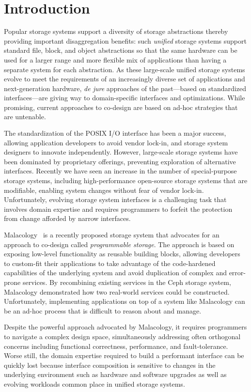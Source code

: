 \section{Introduction}
\label{sec:intro}

Popular storage systems support a diversity of storage abstractions thereby
providing important disaggregation benefits: such \emph{unified} storage
systems support standard file, block, and object abstractions so that the same
hardware can be used for a larger range and more flexible mix of applications
than having a separate  system for each abstraction.  As these large-scale
unified storage systems evolve to meet the requirements of an increasingly
diverse set of applications and next-generation hardware, \emph{de jure}
approaches of the past---based on standardized interfaces---are giving way to
domain-specific interfaces and optimizations. While promising, current
approaches to co-design are based on ad-hoc strategies that are untenable.

The standardization of the POSIX I/O interface has been a major success,
allowing application developers to avoid vendor lock-in, and storage system
designers to innovate independently.
However, large-scale storage systems have been
dominated by proprietary offerings, preventing exploration of alternative
interfaces. Recently we have seen an increase
in the number of special-purpose storage systems, including high-performance
open-source storage systems that are modifiable, enabling system changes
without fear of vendor lock-in. Unfortunately, evolving storage system
interfaces is a challenging task that involves domain expertise and requires
programmers to forfeit the protection from change afforded by narrow
interfaces.

Malacology~\cite{sevilla:eurosys17} is a recently proposed storage system that
advocates for an approach to co-design called \emph{programmable storage}. The
approach is based on exposing low-level functionality as reusable building
blocks, allowing developers to custom-fit their applications to take advantage
of the code-hardened capabilities of the underlying system and avoid
duplication of complex and error-prone services. By recombining existing
services in the Ceph storage system, Malacology demonstrated how two
real-world services could be constructed. Unfortunately, implementing
applications on top of a system like Malacology can be an ad-hoc process
that is difficult to reason about and manage.

Despite the powerful approach advocated by Malacology, it requires programmers
to navigate a complex design space, simultaneously addressing often orthogonal
concerns including functional correctness, performance, and fault-tolerance.
Worse still, the domain expertise required to build a performant interface can
be quickly lost because interface composition is sensitive to changes in the
underlying environment such as hardware and software upgrades as well as
evolving workloads common place in unified storage systems.

